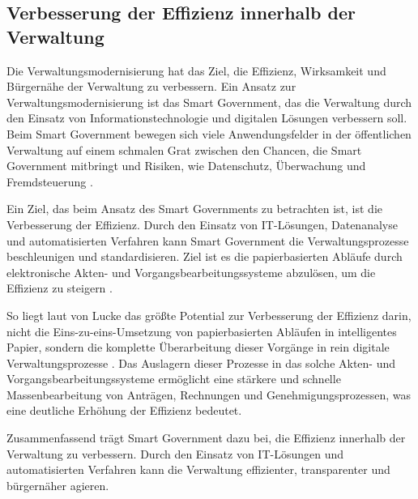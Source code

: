 \subsection{Verbesserung der Effizienz innerhalb der Verwaltung}
Die Verwaltungsmodernisierung hat das Ziel, die Effizienz, Wirksamkeit und Bürgernähe der Verwaltung zu verbessern.
Ein Ansatz zur Verwaltungsmodernisierung ist das Smart Government, das die Verwaltung durch den Einsatz von Informationstechnologie und digitalen Lösungen verbessern soll.
Beim Smart Government bewegen sich viele Anwendungsfelder in der öffentlichen Verwaltung auf einem schmalen Grat zwischen den Chancen, die Smart Government mitbringt und Risiken, wie Datenschutz, Überwachung und Fremdsteuerung \citep[Vgl.][]{Lucke2018}. 
\par
Ein Ziel, das beim Ansatz des Smart Governments zu betrachten ist, ist die Verbesserung der Effizienz.
Durch den Einsatz von IT-Lösungen, Datenanalyse und automatisierten Verfahren kann Smart Government die Verwaltungsprozesse beschleunigen und standardisieren. 
Ziel ist es die papierbasierten Abläufe durch elektronische Akten- und Vorgangsbearbeitungssysteme abzulösen, um die Effizienz zu steigern \citep[][]{von_Lucke_2016}.
\par
So liegt laut von Lucke das größte Potential zur Verbesserung der Effizienz darin, nicht die Eins-zu-eins-Umsetzung von papierbasierten Abläufen in intelligentes Papier, sondern die komplette Überarbeitung dieser Vorgänge in rein digitale Verwaltungsprozesse \citep[][S.179]{von_Lucke_2016}.
Das Auslagern dieser Prozesse in das solche Akten- und Vorgangsbearbeitungssysteme ermöglicht eine stärkere und schnelle Massenbearbeitung von Anträgen, Rechnungen und Genehmigungsprozessen, was eine deutliche Erhöhung der Effizienz bedeutet.
\par
Zusammenfassend trägt Smart Government dazu bei, die Effizienz innerhalb der Verwaltung zu verbessern. 
Durch den Einsatz von IT-Lösungen und automatisierten Verfahren kann die Verwaltung effizienter, transparenter und bürgernäher agieren.